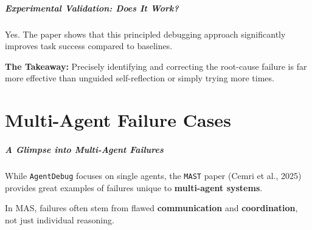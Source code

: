 \documentclass[10pt]{beamer}
\begin{document}
\begin{frame}
  \frametitle{Experimental Validation: Does It Work?}
  Yes. The paper shows that this principled debugging approach significantly improves task success compared to baselines.
  
  
  \textbf{The Takeaway:} Precisely identifying and correcting the root-cause failure is far more effective than unguided self-reflection or simply trying more times.
\end{frame}

\part{Multi-Agent Failure Cases}

\begin{frame}
  \frametitle{A Glimpse into Multi-Agent Failures}
  While \texttt{AgentDebug} focuses on single agents, the \texttt{MAST} paper (Cemri et al., 2025) provides great examples of failures unique to \textbf{multi-agent systems}.
  
  \vfill
  
  In MAS, failures often stem from flawed \textbf{communication} and \textbf{coordination}, not just individual reasoning.
\end{frame}
\end{document}
